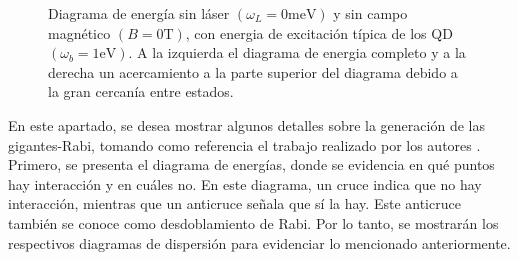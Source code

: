 \documentclass[main.tex]{subfiles}
\begin{document}
\begin{figure}[htbp]
	\caption{Diagrama de energ\'ia sin l\'aser $(\omega_L=0\text{meV})$ y sin campo magn\'etico $(B=0\text{T})$, con energia de excitaci\'on t\'ipica de los QD $(\omega_b=1\text{eV})$. A la izquierda el diagrama de energia completo y a la derecha un acercamiento a la parte superior del diagrama debido a la gran cercan\'ia entre estados.}
\end{figure}

En este apartado, se desea mostrar algunos detalles sobre la generación de las gigantes-Rabi, tomando como referencia el trabajo realizado por los autores \textcite{Vargas2022}. Primero, se presenta el diagrama de energías, donde se evidencia en qué puntos hay interacción y en cuáles no. En este diagrama, un cruce indica que no hay interacción, mientras que un anticruce señala que sí la hay. Este anticruce también se conoce como desdoblamiento de Rabi. Por lo tanto, se mostrarán los respectivos diagramas de dispersión para evidenciar lo mencionado anteriormente.
\end{document}
